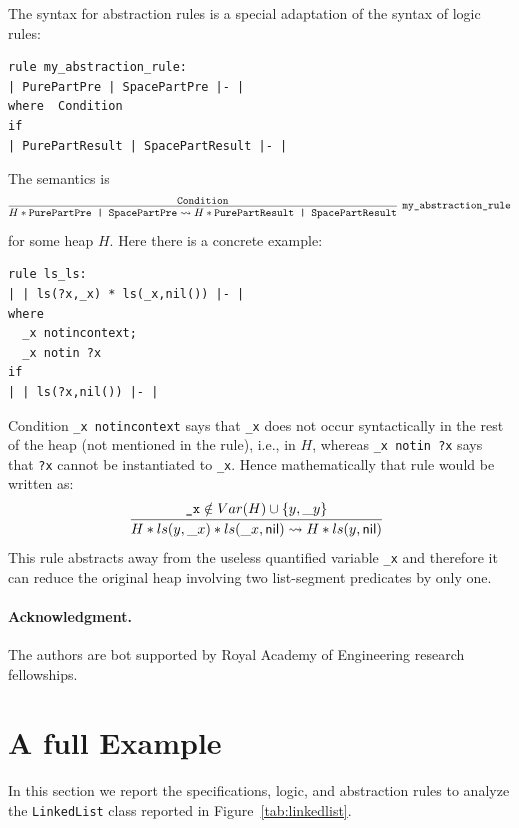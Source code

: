 \documentclass[11pt]{article}
\newcommand{\nil}{{\sf nil}}
\begin{document}
The syntax for abstraction rules is a special adaptation of the syntax of logic rules:
\begin{verbatim}
rule my_abstraction_rule:
| PurePartPre | SpacePartPre |- |   
where  Condition
if 
| PurePartResult | SpacePartResult |- |   
\end{verbatim}
The semantics  is
\[
\infer[\texttt{my\_abstraction\_rule}]
{H* \texttt{PurePartPre | SpacePartPre} \leadsto H*\texttt{PurePartResult | SpacePartResult} }{\texttt{Condition}}
\] for some heap $H$. Here there is a concrete example:
\begin{verbatim}
rule ls_ls:
| | ls(?x,_x) * ls(_x,nil()) |- |   
where 
  _x notincontext;
  _x notin ?x
if 
| | ls(?x,nil()) |- | 
\end{verbatim}
Condition {\tt \_x notincontext} says that {\tt \_x} does not occur syntactically in the rest of the heap (not mentioned in the rule), i.e., in $H$, whereas {\tt \_x notin ?x} says that {\tt ?x} cannot be instantiated to {\tt \_x}. Hence mathematically that rule would be written as:
\[
\infer[]
{H*ls(y,\_x)*ls(\_x,\nil) \leadsto H*ls(y,\nil)}
{\texttt{\_x} \notin Var(H) \cup \{y,\_y \} }
\] This rule abstracts away from the useless quantified variable {\tt \_x} and therefore it can reduce the original heap involving two list-segment predicates by only one.

\paragraph{Acknowledgment.}
The authors are bot supported by Royal Academy of Engineering research fellowships.




\appendix 
\section{A full Example}
In this section we report the specifications, logic, and abstraction rules to analyze the {\tt LinkedList} class
 reported in Figure~\ref{tab:linkedlist}.
\end{document}
